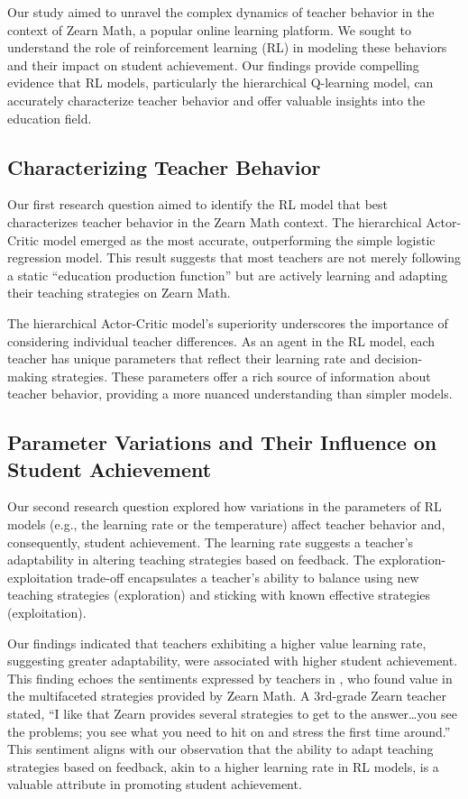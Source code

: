\documentclass[
  number,
  preprint,
  3p,
  onecolumn]{elsarticle}
\begin{document}
Our study aimed to unravel the complex dynamics of teacher behavior in
the context of Zearn Math, a popular online learning platform. We sought
to understand the role of reinforcement learning (RL) in modeling these
behaviors and their impact on student achievement. Our findings provide
compelling evidence that RL models, particularly the hierarchical
Q-learning model, can accurately characterize teacher behavior and offer
valuable insights into the education field.

\subsection{Characterizing Teacher
Behavior}\label{characterizing-teacher-behavior}

Our first research question aimed to identify the RL model that best
characterizes teacher behavior in the Zearn Math context. The
hierarchical Actor-Critic model emerged as the most accurate,
outperforming the simple logistic regression model. This result suggests
that most teachers are not merely following a static ``education
production function'' but are actively learning and adapting their
teaching strategies on Zearn Math.

The hierarchical Actor-Critic model's superiority underscores the
importance of considering individual teacher differences. As an agent in
the RL model, each teacher has unique parameters that reflect their
learning rate and decision-making strategies. These parameters offer a
rich source of information about teacher behavior, providing a more
nuanced understanding than simpler models.

\subsection{Parameter Variations and Their Influence on Student
Achievement}\label{parameter-variations-and-their-influence-on-student-achievement}

Our second research question explored how variations in the parameters
of RL models (e.g., the learning rate or the temperature) affect teacher
behavior and, consequently, student achievement. The learning rate
suggests a teacher's adaptability in altering teaching strategies based
on feedback. The exploration-exploitation trade-off encapsulates a
teacher's ability to balance using new teaching strategies (exploration)
and sticking with known effective strategies (exploitation).

Our findings indicated that teachers exhibiting a higher value learning
rate, suggesting greater adaptability, were associated with higher
student achievement. This finding echoes the sentiments expressed by
teachers in \citep{knudsen2020}, who found value in the multifaceted
strategies provided by Zearn Math. A 3rd-grade Zearn teacher stated, ``I
like that Zearn provides several strategies to get to the
answer\ldots you see the problems; you see what you need to hit on and
stress the first time around.'' This sentiment aligns with our
observation that the ability to adapt teaching strategies based on
feedback, akin to a higher learning rate in RL models, is a valuable
attribute in promoting student achievement.
\end{document}
